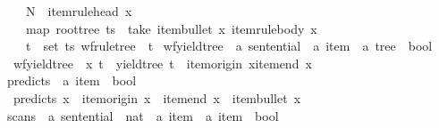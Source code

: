 \begin{isabellebody}
\ \ \ \ N\ {\isacharequal}{\kern0pt}\ item{\isacharunderscore}{\kern0pt}rule{\isacharunderscore}{\kern0pt}head\ x\ {\isasymand}\isanewline
\ \ \ \ map\ root{\isacharunderscore}{\kern0pt}tree\ ts\ {\isacharequal}{\kern0pt}\ take\ {\isacharparenleft}{\kern0pt}item{\isacharunderscore}{\kern0pt}bullet\ x{\isacharparenright}{\kern0pt}\ {\isacharparenleft}{\kern0pt}item{\isacharunderscore}{\kern0pt}rule{\isacharunderscore}{\kern0pt}body\ x{\isacharparenright}{\kern0pt}\ {\isasymand}\isanewline
\ \ \ \ {\isacharparenleft}{\kern0pt}{\isasymforall}t\ {\isasymin}\ set\ ts{\isachardot}{\kern0pt}\ wf{\isacharunderscore}{\kern0pt}rule{\isacharunderscore}{\kern0pt}tree\ {\isasymG}\ t{\isacharparenright}{\kern0pt}{\isacharparenright}{\kern0pt}{\isachardoublequoteclose}\isanewline
\isanewline
{}\isamarkupfalse%
\ wf{\isacharunderscore}{\kern0pt}yield{\isacharunderscore}{\kern0pt}tree\ {\isacharcolon}{\kern0pt}{\isacharcolon}{\kern0pt}\ {\isachardoublequoteopen}{\isacharprime}{\kern0pt}a\ sentential\ {\isasymRightarrow}\ {\isacharprime}{\kern0pt}a\ item\ {\isasymRightarrow}\ {\isacharprime}{\kern0pt}a\ tree\ {\isasymRightarrow}\ bool{\isachardoublequoteclose}\ \isanewline
\ \ {\isachardoublequoteopen}wf{\isacharunderscore}{\kern0pt}yield{\isacharunderscore}{\kern0pt}tree\ {\isasymomega}\ x\ t\ {\isasymequiv}\ yield{\isacharunderscore}{\kern0pt}tree\ t\ {\isacharequal}{\kern0pt}\ {\isasymomega}{\isacharbrackleft}{\kern0pt}item{\isacharunderscore}{\kern0pt}origin\ x{\isachardot}{\kern0pt}{\isachardot}{\kern0pt}item{\isacharunderscore}{\kern0pt}end\ x{\isasymrangle}{\isachardoublequoteclose}%
\isadelimdocument
%
\endisadelimdocument
%
\isatagdocument
%
\isamarkuptrue%
%
\endisatagdocument
{\isafolddocument}%
%
\isadelimdocument
%
\endisadelimdocument
{}\isamarkupfalse%
\ predicts\ {\isacharcolon}{\kern0pt}{\isacharcolon}{\kern0pt}\ {\isachardoublequoteopen}{\isacharprime}{\kern0pt}a\ item\ {\isasymRightarrow}\ bool{\isachardoublequoteclose}\ \isanewline
\ \ {\isachardoublequoteopen}predicts\ x\ {\isasymequiv}\ item{\isacharunderscore}{\kern0pt}origin\ x\ {\isacharequal}{\kern0pt}\ item{\isacharunderscore}{\kern0pt}end\ x\ {\isasymand}\ item{\isacharunderscore}{\kern0pt}bullet\ x\ {\isacharequal}{\kern0pt}\ {}{\isachardoublequoteclose}\isanewline
\isanewline
{}\isamarkupfalse%
\ scans\ {\isacharcolon}{\kern0pt}{\isacharcolon}{\kern0pt}\ {\isachardoublequoteopen}{\isacharprime}{\kern0pt}a\ sentential\ {\isasymRightarrow}\ nat\ {\isasymRightarrow}\ {\isacharprime}{\kern0pt}a\ item\ {\isasymRightarrow}\ {\isacharprime}{\kern0pt}a\ item\ {\isasymRightarrow}\ bool{\isachardoublequoteclose}\ \isanewline

\end{isabellebody}
